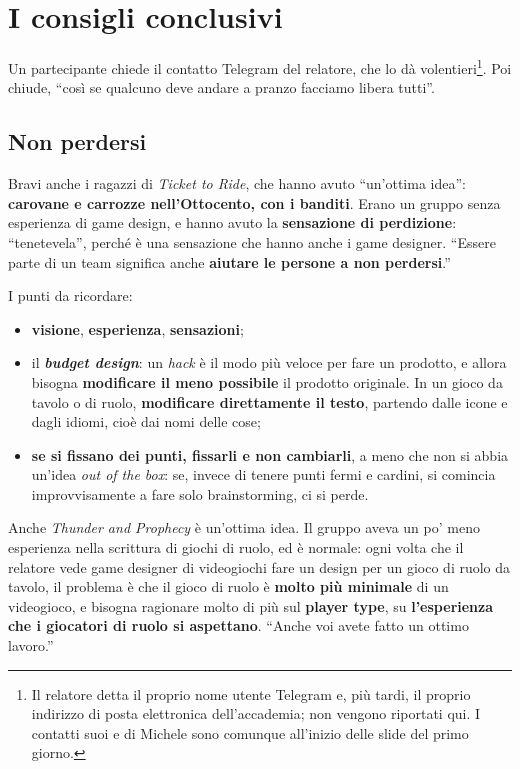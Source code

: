 \section{I consigli conclusivi}
\label{z7:sec:consigli}

Un partecipante chiede il contatto Telegram del relatore, che lo dà
volentieri\footnote{Il relatore detta il proprio nome utente Telegram e, più tardi,
il proprio indirizzo di posta elettronica dell'accademia; non vengono riportati qui.
I contatti suoi e di Michele sono comunque all'inizio delle slide del primo giorno.}.
Poi chiude, ``così se qualcuno deve andare a pranzo facciamo libera tutti''.

\subsection{Non perdersi}

Bravi anche i ragazzi di \emph{Ticket to Ride}, che hanno avuto ``un'ottima idea'':
\textbf{carovane e carrozze nell'Ottocento, con i banditi}. Erano un gruppo senza
esperienza di game design, e hanno avuto la \textbf{sensazione di perdizione}:
``tenetevela'', perché è una sensazione che hanno anche i game designer. ``Essere
parte di un team significa anche \textbf{aiutare le persone a non perdersi}.''

I punti da ricordare:
\begin{itemize}
  \item \textbf{visione}, \textbf{esperienza}, \textbf{sensazioni};
  \item il \textbf{\emph{budget design}}: un \emph{hack} è il modo più veloce per
        fare un prodotto, e allora bisogna \textbf{modificare il meno possibile}
        il prodotto originale. In un gioco da tavolo o di ruolo, \textbf{modificare
        direttamente il testo}, partendo dalle icone e dagli idiomi, cioè dai
        nomi delle cose;
  \item \textbf{se si fissano dei punti, fissarli e non cambiarli}, a meno che non
        si abbia un'idea \emph{out of the box}: se, invece di tenere punti fermi e
        cardini, si comincia improvvisamente a fare solo brainstorming, ci si perde.
\end{itemize}

Anche \emph{Thunder and Prophecy} è un'ottima idea. Il gruppo aveva un po' meno
esperienza nella scrittura di giochi di ruolo, ed è normale: ogni volta che il
relatore vede game designer di videogiochi fare un design per un gioco di ruolo da
tavolo, il problema è che il gioco di ruolo è \textbf{molto più minimale} di un
videogioco, e bisogna ragionare molto di più sul \textbf{player type}, su
\textbf{l'esperienza che i giocatori di ruolo si aspettano}. ``Anche voi avete fatto
un ottimo lavoro.''

